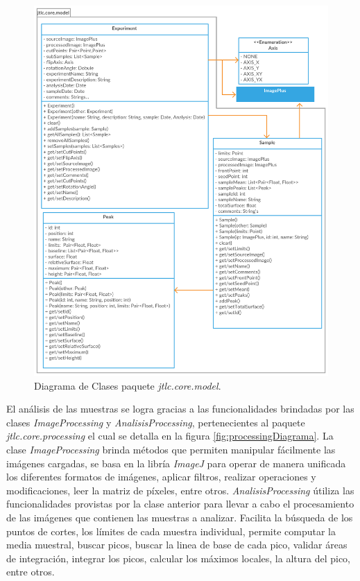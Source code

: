 \begin{figure}[H]
	\centering
	\vspace{-0.5cm}
	\includegraphics[width=425pt]{imagenes-jtlc/model}
	\centering
	\vspace{-0.5cm}
	\caption{Diagrama de Clases paquete \textit{jtlc.core.model}.}
	\label{fig:modeloDiagrama}
\end{figure}

El an\'alisis de las muestras se logra gracias a las funcionalidades brindadas por las clases \textit{ImageProcessing} y \textit{AnalisisProcessing}, pertenecientes al paquete \textit{jtlc.core.processing} el cual se detalla en la figura \ref{fig:processingDiagrama}. La clase \textit{ImageProcessing} brinda m\'etodos que permiten manipular f\'acilmente las im\'agenes cargadas, se basa en la libr\'ia \textit{ImageJ} \cite{imagej} para operar de manera unificada los diferentes formatos de im\'agenes, aplicar filtros, realizar operaciones y modificaciones, leer la matriz de p\'ixeles, entre otros. \textit{AnalisisProcessing} \'utiliza las funcionalidades provistas por la clase anterior para llevar a cabo el procesamiento de las im\'agenes que contienen las muestras a analizar. Facilita la b\'usqueda de los puntos de cortes, los l\'imites de cada muestra individual, permite computar la media muestral, buscar picos, buscar la linea de base de cada pico, validar \'areas de integraci\'on, integrar los picos, calcular los m\'aximos locales, la altura del pico, entre otros.

